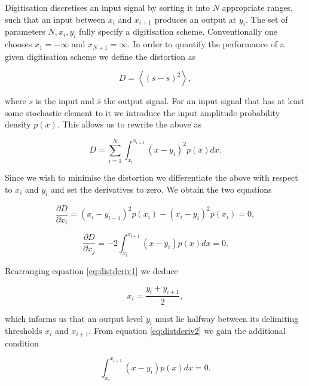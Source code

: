 \documentclass[apj]{emulateapj}
\begin{document}
Digitisation discretises an input signal by sorting it into $N$ appropriate ranges, such that an input between $x_i$ and $x_{i+1}$ produces an output at $y_i$. The set of parameters $N, x_i, y_i$ fully specify a digitisation scheme. Conventionally one chooses $x_{1} = -\infty$ and $x_{N+1} = \infty$. In order to quantify the performance of a given digitisation scheme we define the distortion as

\begin{equation} D = \left\langle  \left( s - \hat{s} \right)^2 \right\rangle, \end{equation}

where $s$ is the input and $\hat{s}$ the output signal. For an input signal that has at least some stochastic element to it we introduce the input amplitude probability density $p(x)$. This allows us to rewrite the above as

\begin{equation} D = \sum_{i = 1}^N \int_{x_i}^{x_{i+1}} \left(x-y_i\right)^2 p(x) dx. \end{equation}

Since we wish to minimise the distortion we differentiate the above with respect to $x_i$ and $y_i$ and set the derivatives to zero. We obtain the two equations

\begin{equation} \label{eq:distderiv1}
\frac{\partial D}{\partial x_i} = \left(x_i-y_{i-1}\right)^2 p(x_i) - \left(x_i - y_i\right)^2 p(x_i) = 0,
\end{equation}

\begin{equation} \label{eq:distderiv2}
\frac{\partial D}{\partial x_j} = -2 \int_{x_i}^{x_{i+1}} \left( x-y_i \right) p(x) dx = 0.
\end{equation}

Rearranging equation \ref{eq:distderiv1} we deduce

\begin{equation} \label{eq:digitequalspacecondition}
x_i = \frac{y_i+y_{i+1}}{2},
\end{equation}

which informs us that an output level $y_i$ must lie halfway between its delimiting thresholds $x_i$ and $x_{i+1}$. From equation \ref{eq:distderiv2} we gain the additional condition

\begin{equation} \label{eq:digitareacondition}
\int_{x_i}^{x_{i+1}} \left( x-y_i \right) p(x) dx = 0.
\end{equation}
\end{document}
